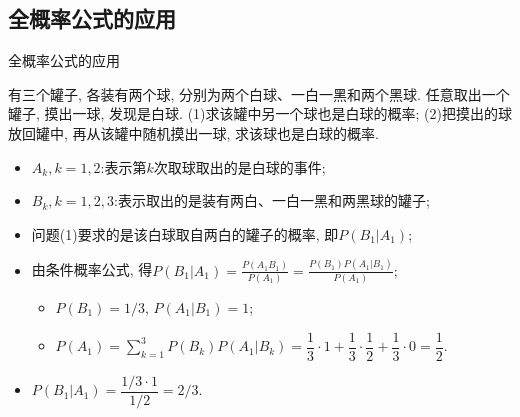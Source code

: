 












\subsection{全概率公式的应用}
\begin{frame}{全概率公式的应用}
	\begin{exam}
		有三个罐子, 各装有两个球, 分别为两个白球、一白一黑和两个黑球. 任意取出一个罐子, 摸出一球, 发现是白球. (1)求该罐中另一个球也是白球的概率; (2)把摸出的球放回罐中, 再从该罐中随机摸出一球, 求该球也是白球的概率.
	\end{exam}

	\begin{jieda}
		\begin{itemize}[<+-|alert@+>]
			\item $A_k, k=1,2$:表示第$k$次取球取出的是白球的事件;
			\item $B_k, k=1,2,3$:表示取出的是装有两白、一白一黑和两黑球的罐子;
			\item 问题(1)要求的是该白球取自两白的罐子的概率, 即$P(B_1|A_1)$;
			\item 由条件概率公式, 得$P(B_1|A_1)=\frac{P(A_1B_1)}{P(A_1)}=\frac{P(B_1)P(A_1|B_1)}{P(A_1)};$%
			\begin{itemize}[<+-|alert@+>]
				\item $P(B_1)=1/3$, \pause $P(A_1|B_1)=1$;\pause
				\item $P(A_1)=\sum\limits_{k=1}^{3}P(B_k)P(A_1|B_k)=\dfrac{1}{3}\cdot 1+\dfrac{1}{3}\cdot\dfrac{1}{2}+\dfrac{1}{3}\cdot 0=\dfrac{1}{2}.$
			\end{itemize}
			\item $P(B_1|A_1)=\dfrac{1/3\cdot 1}{1/2}=2/3$.
		\end{itemize}

	\end{jieda}
\end{frame}

